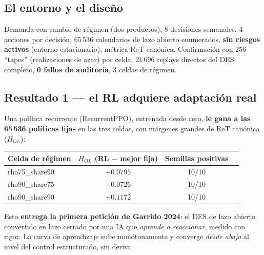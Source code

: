 \documentclass[11pt,a4paper]{article}
\begin{document}
\subsection{El entorno y el diseño}
Demanda con cambio de régimen (dos productos), 8 decisiones semanales, 4 acciones por decisión,
$65\,536$ calendarios de lazo abierto enumerados, \textbf{sin riesgos activos} (entorno estacionario),
métrica ReT canónica. Confirmación con $256$ ``tapes'' (realizaciones de azar) por celda,
$21\,696$ replays directos del DES completo, \textbf{0 fallos de auditoría}, 3 celdas de régimen.

\subsection{Resultado 1 — el RL adquiere adaptación real}
Una política recurrente (RecurrentPPO), entrenada desde cero, \textbf{le gana a las 65\,536 políticas
fijas} en las tres celdas, con márgenes grandes de ReT canónica ($H_{OL}$):
\begin{center}
\begin{tabular}{lccc}
\toprule
Celda de régimen & $H_{OL}$ (RL $-$ mejor fija) & Semillas positivas \\
\midrule
rho75\_share90 & $+0.0795$ & 10/10 \\
rho90\_share75 & $+0.0726$ & 10/10 \\
rho90\_share90 & $+0.1172$ & 10/10 \\
\bottomrule
\end{tabular}
\end{center}
Esto \textbf{entrega la primera petición de Garrido 2024}: el DES de lazo abierto convertido en lazo
cerrado por una IA que \emph{aprende a reaccionar}, medido con rigor. La curva de aprendizaje sube
monótonamente y converge \emph{desde abajo} al nivel del control estructurado, sin deriva.
\end{document}
